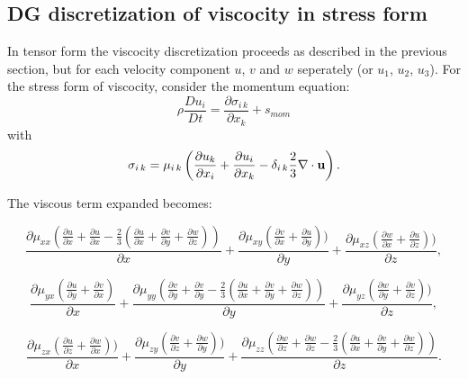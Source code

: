 \subsection{DG discretization of viscocity in stress form} 
In tensor form the viscocity discretization proceeds as described in the 
previous section, but for each velocity component $u$, $v$ and $w$ seperately (or $u_1$, $u_2$, $u_3$). 
For the stress form of viscocity, consider the momentum equation:
\begin{equation}
\rho \frac{ D u_i}{D t} = \frac{\partial \sigma_{i\,k}}{\partial x_k} +s_{mom}
\end{equation}
with 
\begin{equation}
\sigma_{i\, k}=\mu_{i\, k} \left( 
\frac{\partial u_k}{\partial x_i} +  \frac{\partial u_i}{\partial x_k} 
-\delta_{i\, k} \frac{2}{3} \nabla\cdot {\bf u} \right). 
\end{equation}

The viscous term expanded becomes:

\begin{equation}
\frac{\partial \mu_{xx}
(
\frac{\partial u}{\partial x}+\frac{\partial u}{\partial x}
-\frac{2}{3}(\frac{\partial u}{\partial x}+\frac{\partial v}{\partial y}+\frac{\partial w}{\partial z})
)}
{\partial x}
+
\frac{\partial \mu_{xy}
(
\frac{\partial v}{\partial x}+\frac{\partial u}{\partial y})
)}
{\partial y}
+
\frac{\partial \mu_{xz}
(
\frac{\partial w}{\partial x}+\frac{\partial u}{\partial z})
)}
{\partial z}, 
\label{visc-stress-u} 
\end{equation}



\begin{equation}
\frac{\partial \mu_{yx}
(
\frac{\partial u}{\partial y}+\frac{\partial v}{\partial x}
)}
{\partial x}
+
\frac{\partial \mu_{yy}
(
\frac{\partial v}{\partial y}+\frac{\partial v}{\partial y}
-\frac{2}{3}(\frac{\partial u}{\partial x}+\frac{\partial v}{\partial y}+\frac{\partial w}{\partial z})
)}
{\partial y}
+
\frac{\partial \mu_{yz}
(
\frac{\partial w}{\partial y}+\frac{\partial v}{\partial z})
)}
{\partial z}, 
\label{visc-stress-v} 
\end{equation}



\begin{equation}
\frac{\partial \mu_{zx}
(
\frac{\partial u}{\partial z}+\frac{\partial w}{\partial x})
)}
{\partial x}
+
\frac{\partial \mu_{zy}
(
\frac{\partial v}{\partial z}+\frac{\partial w}{\partial y})
)}
{\partial y}
+
\frac{\partial \mu_{zz}
(
\frac{\partial w}{\partial z}+\frac{\partial w}{\partial z}
-\frac{2}{3}(\frac{\partial u}{\partial x}+\frac{\partial v}{\partial y}+\frac{\partial w}{\partial z})
)}
{\partial z}. 
\label{visc-stress-w} 
\end{equation}

